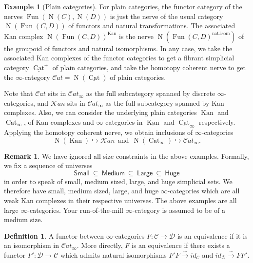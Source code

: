 \documentclass[reqno]{amsart}
\theoremstyle{definition}
\newtheorem{example}[lemma]{Example}
\newtheorem{definition}[lemma]{Definition}
\newtheorem{remark}[lemma]{Remark}
\newcommand{\msc}[1]{\mathscr{#1}}
\newcommand{\msf}[1]{\mathsf{#1}}
\newcommand{\opn}[1]{\operatorname{#1}}
\newcommand{\sKan}{\msc{K}\!an}
\newcommand{\sCat}{\msc{C}\!at}
\DeclareMathOperator{\Fun}{Fun}
\renewcommand{\1}{\mathbf{1}}
\begin{document}
\begin{example}[Plain categories]
For plain categories, the functor category of the nerves $\Fun(\opn{N}(C),\opn{N}(D))$ is just the nerve of the usual category $\opn{N}(\Fun(C,D))$ of functors and natural transformations.  The associated Kan complex $\opn{N}(\Fun(C,D))^{\opn{Kan}}$ is the nerve $\opn{N}(\Fun(C,D)^{\text{nat.isom}})$ of the groupoid of functors and natural isomorphisms.  In any case, we take the associated Kan complexes of the functor categories to get a fibrant simplicial category $\underline{\opn{Cat}}^+$ of plain categories, and take the homotopy coherent nerve to get the $\infty$-category $\msc{C}\!at=\opn{N}(\underline{\opn{Cat}})$ of plain categories. 
\end{example}

Note that $\sCat$ sits in $\sCat_{\infty}$ as the full subcategory spanned by discrete $\infty$-categories, and $\sKan$ sits in $\sCat_{\infty}$ as the full subcategory spanned by Kan complexes. Also, we can consider the underlying plain categories $\opn{Kan}$ and $\opn{Cat}_{\infty}$, of Kan complexes and $\infty$-categories in $\underline{\opn{Kan}}$ and $\underline{\opn{Cat}}_{\infty}$ respectively.  Applying the homotopy coherent nerve, we obtain inclusions of $\infty$-categories
\[
\opn{N}(\opn{Kan})\hookrightarrow \msc{K}\!an\ \ \text{and}\ \ \opn{N}(\opn{Cat}_{\infty})\hookrightarrow \msc{C}\!at_{\infty}.
\]

\begin{remark}
We have ignored all size constraints in the above examples.  Formally, we fix a sequence of universes
\[
\msf{Small}\ \subseteq\ \msf{Medium}\ \subseteq\ \msf{Large}\ \subseteq\ \msf{Huge}
\]
in order to speak of small, medium sized, large, and huge simplicial sets.  We therefore have small, medium sized, large, and huge $\infty$-categories which are all weak Kan complexes in their respective universes.  The above examples are all large $\infty$-categories. Your run-of-the-mill $\infty$-category is assumed to be of a medium size.
\end{remark}

\begin{definition}
A functor between $\infty$-categories $F:\msc{C}\to \msc{D}$ is an equivalence if it is an isomorphism in $\sCat_{\infty}$.  More directly, $F$ is an equivalence if there exists a functor $F':\msc{D}\to \msc{C}$ which admits natural isomorphisms $F'F\overset{\sim}\to id_{\msc{C}}$ and $id_{\msc{D}}\overset{\sim}\to FF'$.
\end{definition}
\end{document}
